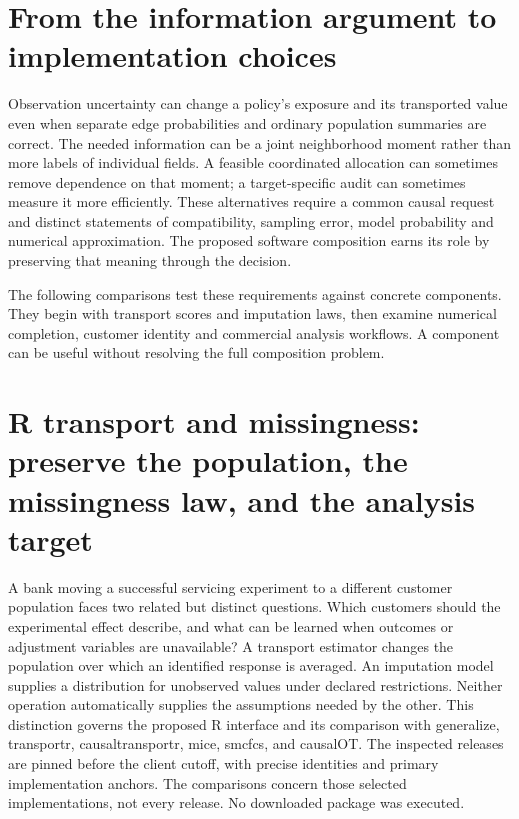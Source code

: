 

\section{From the information argument to implementation choices}
\label{exec17:s7-end}

Observation uncertainty can change a policy's exposure and its transported
value even when separate edge probabilities and ordinary population summaries
are correct. The needed information can be a joint neighborhood moment rather
than more labels of individual fields. A feasible coordinated allocation can
sometimes remove dependence on that moment; a target-specific audit can
sometimes measure it more efficiently. These alternatives require a common
causal request and distinct statements of compatibility, sampling error,
model probability and numerical approximation. The proposed software
composition earns its role by preserving that meaning through the decision.

The following comparisons test these requirements against concrete components.
They begin with transport scores and imputation laws, then examine numerical
completion, customer identity and commercial analysis workflows. A component
can be useful without resolving the full composition problem.


\section[R transport and missingness contracts]{R transport and missingness: preserve the population, the missingness law, and the analysis target}
\label{sec:exec25-rtm}

A bank moving a successful servicing experiment to a different customer population faces two related but distinct questions. Which customers should the experimental effect describe, and what can be learned when outcomes or adjustment variables are unavailable? A transport estimator changes the population over which an identified response is averaged. An imputation model supplies a distribution for unobserved values under declared restrictions. Neither operation automatically supplies the assumptions needed by the other. This distinction governs the proposed R interface and its comparison with generalize, transportr, causaltransportr, mice, smcfcs, and causalOT. The inspected releases are pinned before the client cutoff, with precise identities and primary implementation anchors. The comparisons concern those selected implementations, not every release. No downloaded package was executed.~\citep{exec25_rtm_generalize,exec25_rtm_transportr,exec25_rtm_causaltransportr,exec25_rtm_mice,exec25_rtm_smcfcs,exec25_rtm_causalOT}

